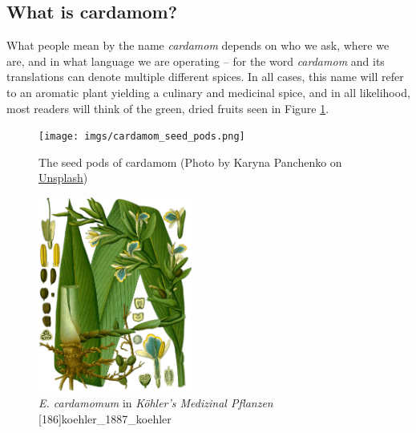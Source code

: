 \documentclass[12pt]{article}
\begin{document}
\subsection{What is cardamom?}

What people mean by the name \textit{cardamom} depends on who we ask, where we are, and in what language we are operating -- for the word \textit{cardamom} and its translations can denote multiple different spices. In all cases, this name will refer to an aromatic plant yielding a culinary and medicinal spice, and in all likelihood, most readers will think of the green, dried fruits seen in Figure \ref{fig:seedpods}.

\begin{figure}[!h]
    \centering
    \texttt{[image: imgs/cardamom\_seed\_pods.png]}
    \caption{The seed pods of cardamom (Photo by Karyna Panchenko on \href{https://unsplash.com/photos/a-pile-of-green-cardamoas-sitting-on-top-of-a-white-table-9_IoYA6EdpY}{Unsplash})}
    \label{fig:seedpods}
\end{figure}



\begin{figure}[!h]
    \centering
    \includegraphics[width=0.45\textwidth]{imgs/cardamom.png}
    \caption{\textit{E. cardamomum} in \textit{Köhler's Medizinal Pflanzen} [186]{koehler_1887_koehler}}
    \label{fig:cardamom}
\end{figure}
\end{document}
